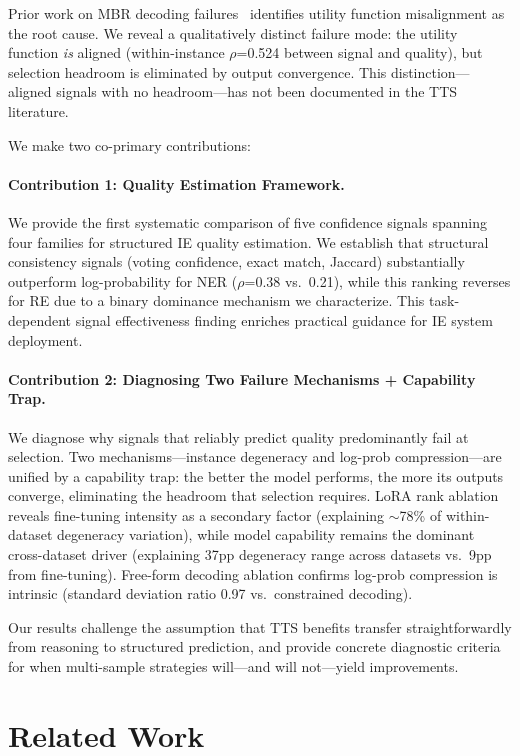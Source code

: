 \documentclass[11pt]{article}
\begin{document}
Prior work on MBR decoding failures~\cite{eikema2022sampling} identifies utility function misalignment as the root cause. We reveal a qualitatively distinct failure mode: the utility function \emph{is} aligned (within-instance $\rho$=0.524 between signal and quality), but selection headroom is eliminated by output convergence. This distinction---aligned signals with no headroom---has not been documented in the TTS literature.

We make two co-primary contributions:

\paragraph{Contribution 1: Quality Estimation Framework.} We provide the first systematic comparison of five confidence signals spanning four families for structured IE quality estimation. We establish that structural consistency signals (voting confidence, exact match, Jaccard) substantially outperform log-probability for NER ($\rho$=0.38 vs.\ 0.21), while this ranking reverses for RE due to a binary dominance mechanism we characterize. This task-dependent signal effectiveness finding enriches practical guidance for IE system deployment.

\paragraph{Contribution 2: Diagnosing Two Failure Mechanisms + Capability Trap.} We diagnose why signals that reliably predict quality predominantly fail at selection. Two mechanisms---instance degeneracy and log-prob compression---are unified by a capability trap: the better the model performs, the more its outputs converge, eliminating the headroom that selection requires. LoRA rank ablation reveals fine-tuning intensity as a secondary factor (explaining $\sim$78\% of within-dataset degeneracy variation), while model capability remains the dominant cross-dataset driver (explaining 37pp degeneracy range across datasets vs.\ 9pp from fine-tuning). Free-form decoding ablation confirms log-prob compression is intrinsic (standard deviation ratio 0.97 vs.\ constrained decoding).

Our results challenge the assumption that TTS benefits transfer straightforwardly from reasoning to structured prediction, and provide concrete diagnostic criteria for when multi-sample strategies will---and will not---yield improvements.

\section{Related Work}
\end{document}
